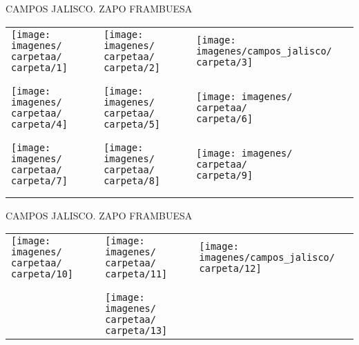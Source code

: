 \documentclass[10pt,letter]{report}
\begin{document}
\begin{center}
	\textcolor{principal}{CAMPOS JALISCO. ZAPO FRAMBUESA}
\end{center}
\begin{table}[H]
\centering

\footnotesize
	\begin{tabular}{m{5cm}m{1cm}m{5cm}m{1cm}m{5cm}}
	
	\texttt{[image: imagenes/\\carpetaa/\\carpeta/1]}&&\texttt{[image: imagenes/\\carpetaa/\\carpeta/2]}&&\texttt{[image: imagenes/campos\_jalisco/\\carpeta/3]}\\
	\\
	\\
	\texttt{[image: imagenes/\\carpetaa/\\carpeta/4]}&&\texttt{[image: imagenes/\\carpetaa/\\carpeta/5]}&&\texttt{[image: imagenes/\\carpetaa/\\carpeta/6]}\\
	\\
	\\
	\texttt{[image: imagenes/\\carpetaa/\\carpeta/7]}&&\texttt{[image: imagenes/\\carpetaa/\\carpeta/8]}&&\texttt{[image: imagenes/\\carpetaa/\\carpeta/9]}\\
	\\	
	\\
	
	\end{tabular}
	
\end{table}
\newpage

\begin{center}
	\textcolor{principal}{CAMPOS JALISCO. ZAPO FRAMBUESA}
\end{center}
\begin{table}[H]
\centering

\footnotesize
	\begin{tabular}{m{5cm}m{1cm}m{5cm}m{1cm}m{5cm}}
	
	\texttt{[image: imagenes/\\carpetaa/\\carpeta/10]}&&\texttt{[image: imagenes/\\carpetaa/\\carpeta/11]}&&\texttt{[image: imagenes/campos\_jalisco/\\carpeta/12]}\\
	\\
	\\
	&&\texttt{[image: imagenes/\\carpetaa/\\carpeta/13]}&&	
	\end{tabular}
	
\end{table}
\newpage

\renewcommand{\carpetaa}{el_pejo}
\end{document}
